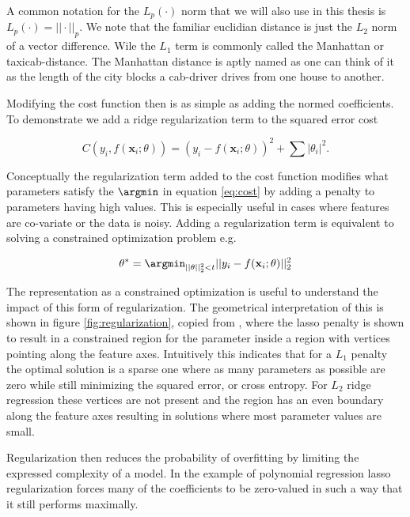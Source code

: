 \noindent A common notation for the $L_p(\cdot)$ norm that we will also use in this thesis is $L_p(\cdot) = ||\cdot||_p$. We note that the familiar euclidian distance is just the $L_2$ norm of a vector difference. Wile the $L_1$ term is commonly called the Manhattan or taxicab-distance. The Manhattan distance is aptly named as one can think of it as the length of the city blocks a cab-driver drives from one house to another.

Modifying the cost function then is as simple as adding the normed coefficients. To demonstrate we add a ridge regularization term to the squared error cost

\begin{equation}\label{eq:mse_ridge}
C(y_i, f(\mathbf{x}_i; \theta)) = (y_i - f(\mathbf{x}_i; \theta))^2 + \sum|\theta_i|^2.
\end{equation}

\noindent Conceptually the regularization term added to the cost function modifies what parameters satisfy the $\argmin$ in equation \ref{eq:cost} by adding a penalty to parameters having high values. This is especially useful in cases where features are co-variate or the data is noisy. Adding a regularization term is equivalent to solving a constrained optimization problem e.g. 

\begin{align}
\theta^* = \argmin_{||\theta||_2^2<t} ||y_i - f(\mathbf{x}_i; \theta)||_2^2
\end{align}

\noindent The representation as a constrained optimization is useful to understand the impact of this form of regularization. The geometrical interpretation of this is shown in figure \ref{fig:regularization}, copied from \cite{Mehta2019}, where the lasso penalty is shown to result in a constrained region for the parameter inside a region with vertices pointing along the feature axes. Intuitively this indicates that for a $L_1$ penalty the optimal solution is a sparse one where as many parameters as possible are zero while still minimizing the squared error, or cross entropy. For $L_2$ ridge regression these vertices are not present and the region has an even boundary along the feature axes resulting in solutions where most parameter values are small. 

Regularization then reduces the probability of overfitting by limiting the expressed complexity of a model. In the example of polynomial regression lasso regularization forces many of the coefficients to be zero-valued in such a way that it still performs maximally.  

